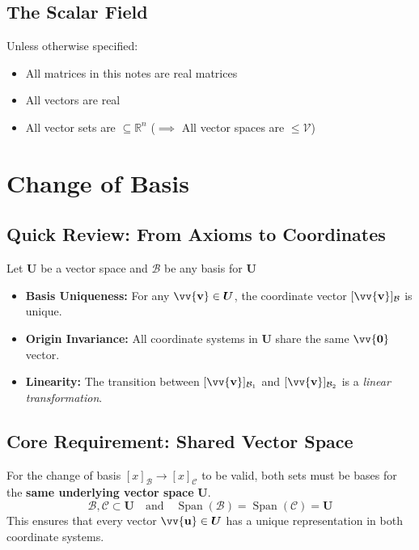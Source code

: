 \documentclass[11pt]{article}
\DeclareRobustCommand{\myvec}[1]{\vv{\mathbf{#1}}}
\newcommand{\myvecsp}[1]{\bm{\mathcal{#1}}}
\newcommand{\mysubvecsp}[1]{\bm{{#1}}}
\newcommand{\myset}[1]{\mathcal{#1}}
\begin{document}
    \subsection{The Scalar Field}
    Unless otherwise specified:
    \begin{itemize}
        \item All matrices in this notes are real matrices
        \item All vectors are real
        \item All vector sets are $\subseteq \mathbb{R}^n$ ($\implies$ All vector spaces are $\le \myvecsp{V}$)
    \end{itemize}

    \newpage
    \section{Change of Basis}
    \subsection*{Quick Review: From Axioms to Coordinates}
    Let $\mysubvecsp{U}$ be a vector space and $\myset{B}$ be any basis for $\mysubvecsp{U}$
    \begin{itemize}
        \item \textbf{Basis Uniqueness:} For any $\myvec{v} \in \mysubvecsp{U}$, the coordinate vector $[\myvec{v}]_\myset{B}$ is unique.
        \item \textbf{Origin Invariance:} All coordinate systems in $\mysubvecsp{U}$ share the same $\myvec{0}$ vector.
        \item \textbf{Linearity:} The transition between $[\myvec{v}]_{\mathcal{B}_1}$ and $[\myvec{v}]_{\mathcal{B}_2}$ is a \textit{linear transformation}.
    \end{itemize}
    \subsection{Core Requirement: Shared Vector Space}
    For the change of basis $[x]_\myset{B} \to [x]_\myset{C}$ to be valid, both sets must be bases for the \textbf{same underlying vector space} $\mysubvecsp{U}$.
    \begin{equation}
        \myset{B}, \myset{C} \subset \mysubvecsp{U} \quad \text{and} \quad \operatorname{Span}(\myset{B}) = \operatorname{Span}(\myset{C}) = \mysubvecsp{U}
    \end{equation}
    This ensures that every vector $\myvec{u} \in \mysubvecsp{U}$ has a unique representation in both coordinate systems.
\end{document}
